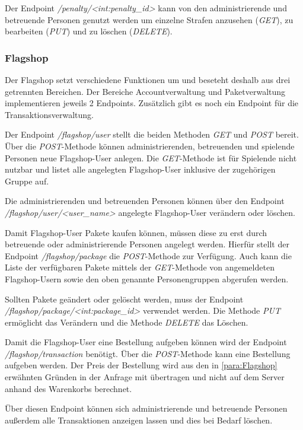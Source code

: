 Der Endpoint \textit{/penalty/<int:penalty\_id>} kann von den administrierende und betreuende Personen genutzt werden um einzelne Strafen anzusehen (\textit{GET}), zu bearbeiten (\textit{PUT}) und zu löschen (\textit{DELETE}).

\subsubsection{Flagshop}
Der Flagshop setzt verschiedene Funktionen um und beseteht deshalb aus drei getrennten Bereichen. Der Bereiche Accountverwaltung und Paketverwaltung implementieren jeweils 2 Endpoints. Zusätzlich gibt es noch ein Endpoint für die Transaktionsverwaltung. 

Der Endpoint \textit{/flagshop/user} stellt die beiden Methoden \textit{GET} und \textit{POST} bereit. Über die \textit{POST}-Methode können administrierenden, betreuenden und spielende Personen neue Flagshop-User anlegen. Die \textit{GET}-Methode ist für Spielende nicht nutzbar und listet alle angelegten Flagshop-User inklusive der zugehörigen Gruppe auf.

Die administrierenden und betreuenden Personen können über den Endpoint \textit{/flagshop/user/<user\_name>} angelegte Flagshop-User verändern oder löschen.

Damit Flagshop-User Pakete kaufen können, müssen diese zu erst durch betreuende oder administrierende Personen angelegt werden. Hierfür stellt der Endpoint \textit{/flagshop/package} die \textit{POST}-Methode zur Verfügung. Auch kann die Liste der verfügbaren Pakete mittels der \textit{GET}-Methode von angemeldeten Flagshop-Usern sowie den oben genannte Personengruppen abgerufen werden.

Sollten Pakete geändert oder gelöscht werden, muss der Endpoint \textit{/flagshop/package/<int:package\_id>} verwendet werden. Die Methode \textit{PUT} ermöglicht das Verändern und die Methode \textit{DELETE} das Löschen.

Damit die Flagshop-User eine Bestellung aufgeben können wird der Endpoint \textit{/flagshop/transaction} benötigt. Über die \textit{POST}-Methode kann eine Bestellung aufgeben werden. Der Preis der Bestellung wird aus den in \autoref{para:Flagshop} erwähnten Gründen in der Anfrage mit übertragen und nicht auf dem Server anhand des Warenkorbs berechnet.

Über diesen Endpoint können sich administrierende und betreuende Personen außerdem alle Transaktionen anzeigen lassen und dies bei Bedarf löschen.

